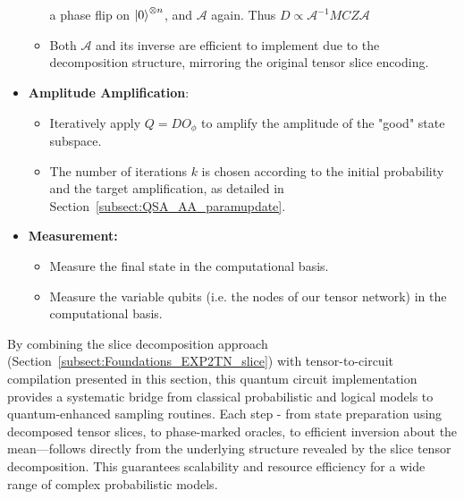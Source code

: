 \documentclass[encoding=utf8,british]{tumphthesis}
\begin{document}
\begin{itemize}
\begin{itemize}
                        a phase flip on $\left|0\right>^{\otimes n}$, and $\mathcal{A}$ again. Thus $D \propto \mathcal{A}^{-1} MC\hat{Z} \mathcal{A}$
                        \item Both $\mathcal{A}$ and its inverse are efficient to implement due to the decomposition structure, mirroring the original tensor slice encoding.
                    \end{itemize}
                \item \textbf{Amplitude Amplification}:
                    \begin{itemize}
                        \item Iteratively apply $Q = D O_\phi$ to amplify the amplitude of the "good" state subspace.
                        \item The number of iterations $k$ is chosen according to the initial probability and the target amplification, as detailed in Section~\ref{subsect:QSA_AA_paramupdate}.
                    \end{itemize}
                \item \textbf{Measurement:}
                    \begin{itemize}
                        \item Measure the final state in the computational basis.
                        \item Measure the variable qubits (i.e. the nodes of our tensor network) in the computational basis.
                    \end{itemize} 
            \end{itemize}

            By combining the slice decomposition approach (Section~\ref{subsect:Foundations_EXP2TN_slice}) with tensor-to-circuit 
            compilation presented in this section, this quantum circuit implementation provides a systematic bridge from classical 
            probabilistic and logical models to quantum-enhanced sampling routines. Each step - from state preparation using decomposed 
            tensor slices, to phase-marked oracles, to efficient inversion about the mean—follows directly from the underlying structure 
            revealed by the slice tensor decomposition. This guarantees scalability and resource efficiency for a wide range of complex probabilistic models.
\end{document}
